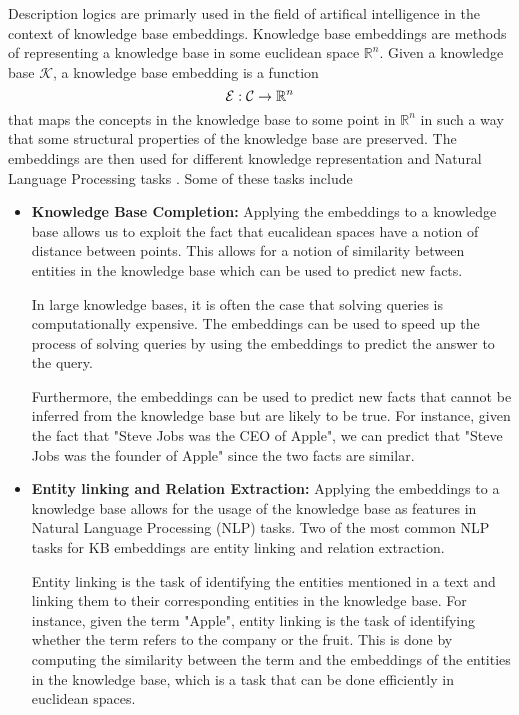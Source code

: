 Description logics are primarly used in the field of artifical intelligence in the context of knowledge base embeddings.
Knowledge base embeddings are methods of representing a knowledge base in some euclidean space $\mathbb{R}^n$.
Given a knowledge base $\mathcal{K}$, a knowledge base embedding is a function
\[
    \mathcal{E} : \mathcal{C} \rightarrow \mathbb{R}^n
\]
that maps the concepts in the knowledge base to some point in $\mathbb{R}^n$ 
in such a way that some structural properties of the knowledge base are preserved. The embeddings are then used
for different knowledge representation and Natural Language Processing tasks \cite{SurveryKG}.
Some of these tasks include
\begin{itemize}
    \item \textbf{Knowledge Base Completion:} Applying the embeddings to a knowledge base allows us to
    exploit the fact that eucalidean spaces have a notion of distance between points.
    This allows for a notion of similarity between entities in the knowledge base
    which can be used to predict new facts.
    \par In large knowledge bases, it is often the case that solving queries is computationally expensive.
    The embeddings can be used to speed up the process of solving queries by using the embeddings to
    predict the answer to the query.
    \par Furthermore, the embeddings can be used to predict new facts that cannot be inferred from the knowledge base
    but are likely to be true.
    For instance, given the fact that "Steve Jobs was the CEO of Apple", we can predict that "Steve Jobs was the founder of Apple"
    since the two facts are similar.
    \item \textbf{Entity linking and Relation Extraction:} Applying the embeddings to a knowledge base allows for
    the usage of the knowledge base as features in Natural Language Processing (NLP) tasks.
    Two of the most common NLP tasks for KB embeddings are entity linking and relation extraction.
    \par Entity linking is the task of identifying the entities mentioned in a text and linking them to their corresponding
    entities in the knowledge base.
    For instance, given the term "Apple", entity linking is the task of identifying whether the term refers to the company or the fruit.
    This is done by computing the similarity between the term and the embeddings of the entities in the knowledge base,
    which is a task that can be done efficiently in euclidean spaces.

\end{itemize}
